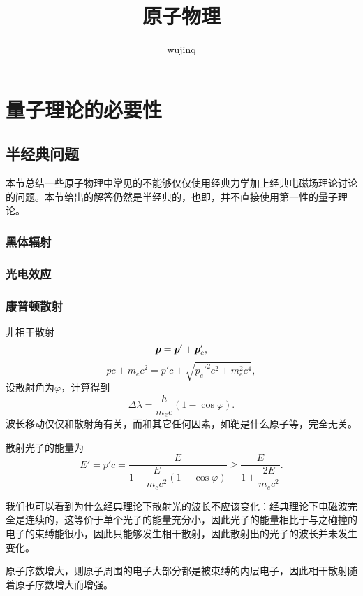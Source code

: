 \documentclass[UTF8, a4paper]{ctexart}
\title{原子物理}
\author{wujinq}
\begin{document}
\maketitle


\section{量子理论的必要性}

\subsection{半经典问题}

本节总结一些原子物理中常见的不能够仅仅使用经典力学加上经典电磁场理论讨论的问题。本节给出的解答仍然是半经典的，也即，并不直接使用第一性的量子理论。

\subsubsection{黑体辐射}

\subsubsection{光电效应}

\subsubsection{康普顿散射}

非相干散射
\[
    \vb*{p} = \vb*{p}' + \vb*{p}'_e,
\]
\[
    pc + m_e c^2 = p' c + \sqrt{{p_e'}^2 c^2 + m_e^2 c^4},
\]
设散射角为$\varphi$，计算得到
\begin{equation}
    \Delta \lambda = \frac{h}{m_e c} (1 - \cos \varphi).
\end{equation}
波长移动仅仅和散射角有关，而和其它任何因素，如靶是什么原子等，完全无关。

散射光子的能量为
\begin{equation}
    E' = p'c = \frac{E}{1 + \dfrac{E}{m_e c^2}(1 - \cos \varphi)} \geq \frac{E}{1 + \dfrac{2 E}{m_e c^2}}.
\end{equation}

我们也可以看到为什么经典理论下散射光的波长不应该变化：经典理论下电磁波完全是连续的，这等价于单个光子的能量充分小，因此光子的能量相比于与之碰撞的电子的束缚能很小，因此只能够发生相干散射，因此散射出的光子的波长并未发生变化。

原子序数增大，则原子周围的电子大部分都是被束缚的内层电子，因此相干散射随着原子序数增大而增强。
\end{document}
